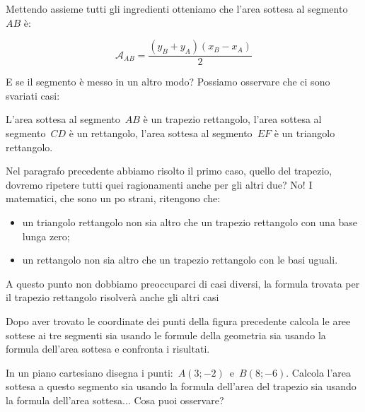 Mettendo assieme tutti gli ingredienti otteniamo che l'area sottesa al 
segmento~$AB$ è:

\[\mathcal{A}_{AB} = \frac{(y_B + y_A) (x_B - x_A)}{2}\]

E se il segmento è messo in un altro modo?
Possiamo osservare che ci sono svariati casi:


\begin{center} \areasottesamolti \end{center}

L'area sottesa al segmento~$AB$ è un trapezio rettangolo, 
l'area sottesa al segmento~$CD$ è un rettangolo, 
l'area sottesa al segmento~$EF$ è un triangolo rettangolo.

Nel paragrafo precedente abbiamo risolto il primo caso, quello del trapezio,
dovremo ripetere tutti quei ragionamenti anche per gli altri due? No! 
I matematici, che sono un po strani, ritengono che:

\begin{itemize} [noitemsep]
 \item 
  un triangolo rettangolo
  non sia altro che un trapezio rettangolo con una base lunga zero;
 \item 
  un rettangolo
  non sia altro che un trapezio rettangolo con le basi uguali.
\end{itemize}

A questo punto non dobbiamo preoccuparci di casi diversi, la formula trovata 
per il trapezio rettangolo risolverà anche gli altri casi

\begin{exrig}
 \begin{esempio}
\label{ex:D.18}
  Dopo aver trovato le coordinate dei punti della figura precedente calcola
  le aree sottese ai tre segmenti sia usando le formule della geometria
  sia usando la formula dell'area sottesa e confronta i risultati.
 \end{esempio}

 \begin{esempio}
  In un piano cartesiano disegna i punti:~$A(3; -2)$~e~$B(8; -6)$. 
  Calcola l'area sottesa a questo segmento sia usando la formula 
  dell'area del trapezio sia usando la formula dell'area sottesa...
  Cosa puoi osservare?
 \end{esempio}
\end{exrig}

